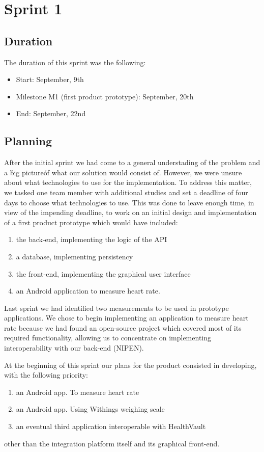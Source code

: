 	
\chapter{Sprint 1}
\label{Sprint1}

\section{Duration}
The duration of this sprint was the following:
\begin{itemize}
\item Start: September, 9th
\item Milestone M1 (first product prototype): September, 20th
\item End: September, 22nd
\end{itemize}

\section{Planning}

After the initial sprint we had come to a general understading of the problem and a \'big picture\' of what our solution would consist of. 
However, we were unsure about what technologies to use for the implementation. 
To address this matter, we tasked one team member with additional studies and set a deadline of four days to choose what technologies to use.
This was done to leave enough time, in view of the impending deadline, to work on an initial design and implementation of a first product prototype which would have included:
\begin{enumerate}
\item the back-end, implementing the logic of the API
\item a database, implementing persistency
\item the front-end, implementing the graphical user interface
\item an Android application to measure heart rate.
\end{enumerate}

Last sprint we had identified two measurements to be used in prototype applications.
We chose to begin implementing an application to measure heart rate because we had found an open-source project which covered most of its required functionality, allowing us to concentrate on implementing interoperability with our back-end (NIPEN).

At the beginning of this sprint our plans for the product consisted in developing, with the following priority:
\begin{enumerate}[1.]
\item an Android app. To measure heart rate
\item an Android app. Using Withings weighing scale
\item an eventual third application interoperable with HealthVault
\end{enumerate}
other than the integration platform itself and its graphical front-end.

